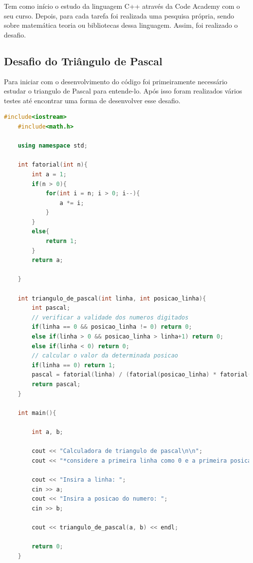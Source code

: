 
Tem como início o estudo da linguagem C++ através da Code Academy com o seu curso. Depois, para cada tarefa foi realizada uma pesquisa própria, sendo sobre matemática teoria ou bibliotecas dessa linguagem. Assim, foi realizado o desafio.

\subsection{Desafio do Triângulo de Pascal}

Para iniciar com o desenvolvimento do código foi primeiramente necessário estudar o triangulo de Pascal \cite{Triângul17:online} para entende-lo. Após isso foram realizados vários testes até encontrar uma forma de desenvolver esse desafio.

\begin{lstlisting}[language=C++]
    #include<iostream>
    #include<math.h>

    using namespace std;

    int fatorial(int n){
        int a = 1;
        if(n > 0){
            for(int i = n; i > 0; i--){
                a *= i;
            }
        }
        else{
            return 1;
        }
        return a;

    }

    int triangulo_de_pascal(int linha, int posicao_linha){
        int pascal;
        // verificar a validade dos numeros digitados
        if(linha == 0 && posicao_linha != 0) return 0;
        else if(linha > 0 && posicao_linha > linha+1) return 0;
        else if(linha < 0) return 0; 
        // calcular o valor da determinada posicao
        if(linha == 0) return 1;
        pascal = fatorial(linha) / (fatorial(posicao_linha) * fatorial(linha-posicao_linha));
        return pascal;
    }

    int main(){

        int a, b;

        cout << "Calculadora de triangulo de pascal\n\n";
        cout << "*considere a primeira linha como 0 e a primeira posicao com 0 tambem*\n\n";

        cout << "Insira a linha: ";
        cin >> a;
        cout << "Insira a posicao do numero: ";
        cin >> b;

        cout << triangulo_de_pascal(a, b) << endl;

        return 0;
    }
\end{lstlisting}


